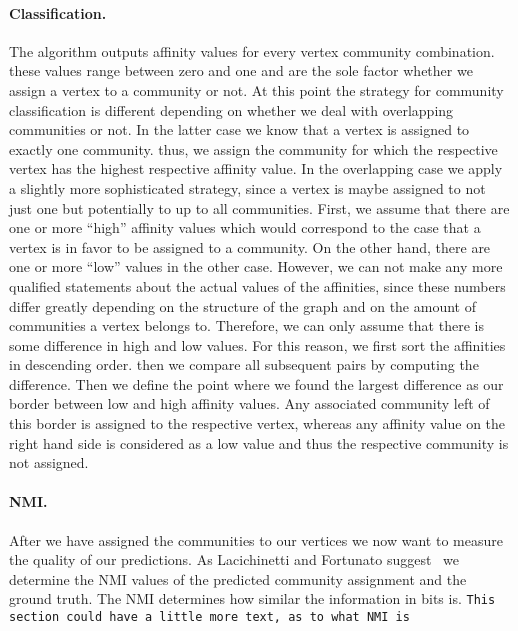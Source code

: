 \paragraph{Classification.}
The algorithm outputs affinity values for every vertex community combination. 
these values range between zero and one and are the sole factor whether we 
assign a vertex to a community or not. At this point the strategy for community classification is different depending on whether we deal with overlapping communities or not. In the latter case we know that a vertex is assigned to exactly one community. thus, we assign the community for which the respective vertex has the highest respective affinity value. In the overlapping case we apply a slightly more sophisticated strategy, since a vertex is maybe assigned to not just one but potentially to up to all communities. First, we assume that there are one or more ``high'' affinity values which would correspond to the 
case that a vertex is in favor to be assigned to a community. On the other hand, there are one or more ``low'' values in the other case. However, we can not make any more qualified statements about the actual values of the affinities, since these numbers differ greatly depending on the structure of the graph and on the amount of communities a vertex belongs to. Therefore, we can only assume that there is some difference in high and low values. For this reason, we first sort the affinities in descending order. then we compare all subsequent pairs by computing the difference. Then we define the point where we found the largest difference as our border between low and high affinity values. Any associated community left of this border is assigned to the respective vertex, whereas any affinity value on the right hand side is considered as a low value and thus the respective community is not assigned.

\paragraph{NMI.}
After we have assigned the communities to our vertices we now want to measure 
the quality of our predictions. As Lacichinetti and Fortunato 
suggest~\cite{LF09} we determine the NMI values of the predicted community 
assignment and the ground truth. The NMI determines how similar the 
information in bits is. \texttt{This section could have a little more text, as to what NMI is}